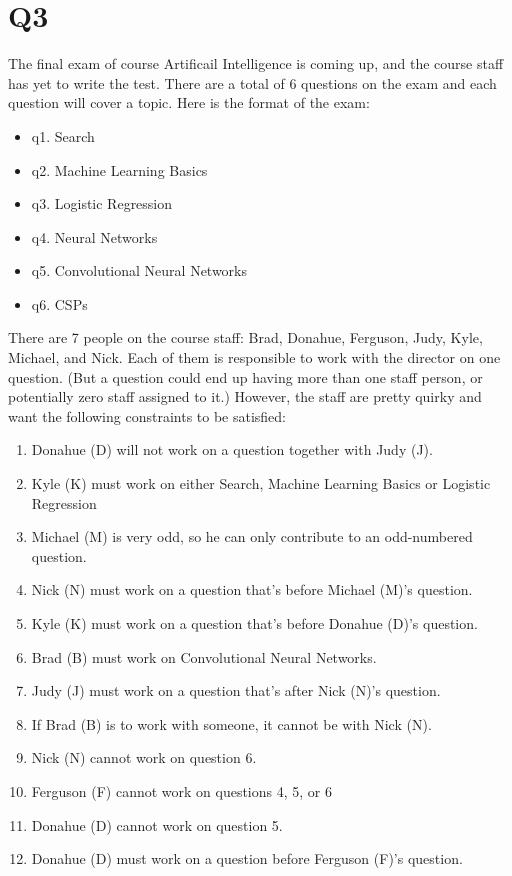 \documentclass{article}
\begin{document}
\newpage

\section{Q3}
The final exam of course Artificail Intelligence is coming up, and the course staff has yet to write the test. There are a total of 6 questions on the exam and each question will cover a topic. Here is the format of the exam:
\begin{itemize}
    \item q1. Search
    \item q2. Machine Learning Basics
    \item q3. Logistic Regression
    \item q4. Neural Networks
    \item q5. Convolutional Neural Networks
    \item q6. CSPs
\end{itemize}

There are 7 people on the course staff: Brad, Donahue, Ferguson, Judy, Kyle, Michael, and Nick. Each of them is responsible to work with the director on one question. (But a question could end up having more than one staff person, or potentially zero staff assigned to it.) However, the staff are pretty quirky and want the following constraints to be satisfied:

\begin{enumerate}[i]
  \item Donahue (D) will not work on a question together with Judy (J).
  \item Kyle (K) must work on either Search, Machine Learning Basics or Logistic Regression
  \item Michael (M) is very odd, so he can only contribute to an odd-numbered question.
  \item Nick (N) must work on a question that’s before Michael (M)’s question.
  \item Kyle (K) must work on a question that’s before Donahue (D)’s question.
  \item Brad (B) must work on Convolutional Neural Networks.
  \item Judy (J) must work on a question that’s after Nick (N)’s question.
  \item If Brad (B) is to work with someone, it cannot be with Nick (N).
  \item Nick (N) cannot work on question 6.
  \item Ferguson (F) cannot work on questions 4, 5, or 6
  \item Donahue (D) cannot work on question 5.
  \item Donahue (D) must work on a question before Ferguson (F)’s question.
\end{enumerate}
\newpage
\end{document}
